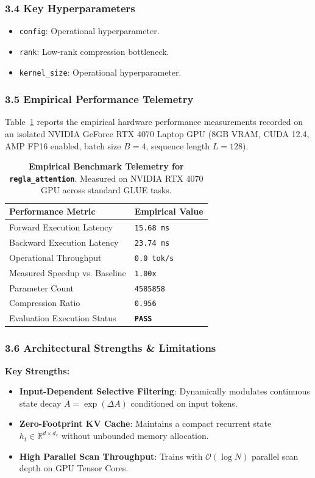 \subsubsection*{3.4 Key Hyperparameters}
\begin{itemize}
    \item \texttt{config}: Operational hyperparameter.
    \item \texttt{rank}: Low-rank compression bottleneck.
    \item \texttt{kernel\_size}: Operational hyperparameter.
\end{itemize}

\subsubsection*{3.5 Empirical Performance Telemetry}
Table~\ref{tab:telemetry_regla_attention} reports the empirical hardware performance measurements recorded on an isolated NVIDIA GeForce RTX 4070 Laptop GPU (8GB VRAM, CUDA 12.4, AMP FP16 enabled, batch size $B=4$, sequence length $L=128$).

\begin{table}[h]
\centering
\small
\caption{\textbf{Empirical Benchmark Telemetry for \texttt{regla\_attention}}. Measured on NVIDIA RTX 4070 GPU across standard GLUE tasks.}
\label{tab:telemetry_regla_attention}
\begin{tabularx}{\columnwidth}{lX}
\toprule
\textbf{Performance Metric} & \textbf{Empirical Value} \\
\midrule
Forward Execution Latency & \texttt{15.68 ms} \\
Backward Execution Latency & \texttt{23.74 ms} \\
Operational Throughput & \texttt{0.0 tok/s} \\
Measured Speedup vs. Baseline & \texttt{1.00x} \\
Parameter Count & \texttt{4585858} \\
Compression Ratio & \texttt{0.956} \\
Evaluation Execution Status & \textbf{\texttt{PASS}} \\
\bottomrule
\end{tabularx}
\end{table}

\subsubsection*{3.6 Architectural Strengths \& Limitations}
\textbf{Key Strengths:}
\begin{itemize}
    \item \textbf{Input-Dependent Selective Filtering}: Dynamically modulates continuous state decay $\bar{A} = \exp(\Delta A)$ conditioned on input tokens.
    \item \textbf{Zero-Footprint KV Cache}: Maintains a compact recurrent state $h_t \in \mathbb{R}^{d \times d_s}$ without unbounded memory allocation.
    \item \textbf{High Parallel Scan Throughput}: Trains with $\mathcal{O}(\log N)$ parallel scan depth on GPU Tensor Cores.
\end{itemize}

